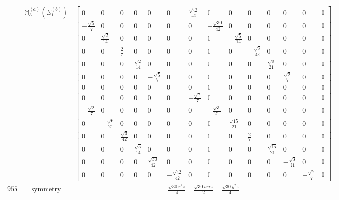 \documentclass[fleqn,8pt,landscape]{jsarticle}
\begin{document}
\begin{longtable}{ccc}
$  $ & $ \mathbb{M}_{3}^{(a)}(E_{1}^{(b)}) $ & $ \begin{bmatrix} 0 & 0 & 0 & 0 & 0 & 0 & \frac{\sqrt{42}}{42} & 0 & 0 & 0 & 0 & 0 & 0 & 0 \\ - \frac{\sqrt{5}}{7} & 0 & 0 & 0 & 0 & 0 & 0 & - \frac{\sqrt{30}}{42} & 0 & 0 & 0 & 0 & 0 & 0 \\ 0 & \frac{\sqrt{2}}{14} & 0 & 0 & 0 & 0 & 0 & 0 & - \frac{\sqrt{5}}{14} & 0 & 0 & 0 & 0 & 0 \\ 0 & 0 & \frac{2}{7} & 0 & 0 & 0 & 0 & 0 & 0 & - \frac{\sqrt{3}}{42} & 0 & 0 & 0 & 0 \\ 0 & 0 & 0 & \frac{\sqrt{2}}{14} & 0 & 0 & 0 & 0 & 0 & 0 & \frac{\sqrt{6}}{21} & 0 & 0 & 0 \\ 0 & 0 & 0 & 0 & - \frac{\sqrt{5}}{7} & 0 & 0 & 0 & 0 & 0 & 0 & \frac{\sqrt{2}}{7} & 0 & 0 \\ 0 & 0 & 0 & 0 & 0 & 0 & 0 & 0 & 0 & 0 & 0 & 0 & 0 & 0 \\ 0 & 0 & 0 & 0 & 0 & 0 & - \frac{\sqrt{7}}{7} & 0 & 0 & 0 & 0 & 0 & 0 & 0 \\ - \frac{\sqrt{2}}{7} & 0 & 0 & 0 & 0 & 0 & 0 & - \frac{\sqrt{3}}{21} & 0 & 0 & 0 & 0 & 0 & 0 \\ 0 & - \frac{\sqrt{6}}{21} & 0 & 0 & 0 & 0 & 0 & 0 & \frac{\sqrt{15}}{21} & 0 & 0 & 0 & 0 & 0 \\ 0 & 0 & \frac{\sqrt{3}}{42} & 0 & 0 & 0 & 0 & 0 & 0 & \frac{2}{7} & 0 & 0 & 0 & 0 \\ 0 & 0 & 0 & \frac{\sqrt{5}}{14} & 0 & 0 & 0 & 0 & 0 & 0 & \frac{\sqrt{15}}{21} & 0 & 0 & 0 \\ 0 & 0 & 0 & 0 & \frac{\sqrt{30}}{42} & 0 & 0 & 0 & 0 & 0 & 0 & - \frac{\sqrt{3}}{21} & 0 & 0 \\ 0 & 0 & 0 & 0 & 0 & - \frac{\sqrt{42}}{42} & 0 & 0 & 0 & 0 & 0 & 0 & - \frac{\sqrt{7}}{7} & 0 \end{bmatrix} $ \\ \hline
$ 955 $ & $ \text{symmetry} $ & $ \frac{\sqrt{30} x^{2} z}{4} - \frac{\sqrt{30} i x y z}{2} - \frac{\sqrt{30} y^{2} z}{4} $ \\

\end{longtable}
\end{document}
